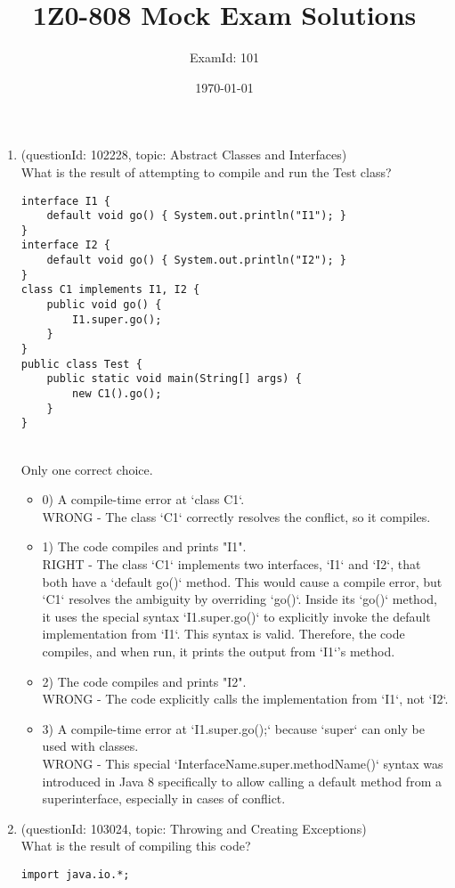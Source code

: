 \documentclass[12pt]{article}
\title{\textbf{1Z0-808 Mock Exam Solutions}}
\author{ExamId: 101}
\date{\today}
\begin{document}
\maketitle
\newpage\begin{enumerate}[label=(\arabic*)]
\item (questionId: 102228, topic: Abstract Classes and Interfaces) \\ 
What is the result of attempting to compile and run the Test class?\n\begin{verbatim}
interface I1 {
    default void go() { System.out.println("I1"); }
}
interface I2 {
    default void go() { System.out.println("I2"); }
}
class C1 implements I1, I2 {
    public void go() {
        I1.super.go();
    }
}
public class Test {
    public static void main(String[] args) {
        new C1().go();
    }
}
\end{verbatim}
\\ \noindent Only one correct choice. 
\begin{itemize}
\item 0) A compile-time error at `class C1`.
 \\ 
WRONG - The class `C1` correctly resolves the conflict, so it compiles.

\item 1) The code compiles and prints "I1".
 \\ 
RIGHT - The class `C1` implements two interfaces, `I1` and `I2`, that both have a `default go()` method. This would cause a compile error, but `C1` resolves the ambiguity by overriding `go()`. Inside its `go()` method, it uses the special syntax `I1.super.go()` to explicitly invoke the default implementation from `I1`. This syntax is valid. Therefore, the code compiles, and when run, it prints the output from `I1`'s method.

\item 2) The code compiles and prints "I2".
 \\ 
WRONG - The code explicitly calls the implementation from `I1`, not `I2`.

\item 3) A compile-time error at `I1.super.go();` because `super` can only be used with classes.
 \\ 
WRONG - This special `InterfaceName.super.methodName()` syntax was introduced in Java 8 specifically to allow calling a default method from a superinterface, especially in cases of conflict.

\end{itemize}
\item (questionId: 103024, topic: Throwing and Creating Exceptions) \\ 
What is the result of compiling this code?
\begin{verbatim}
import java.io.*;


\end{verbatim}
\end{enumerate}
\end{document}
